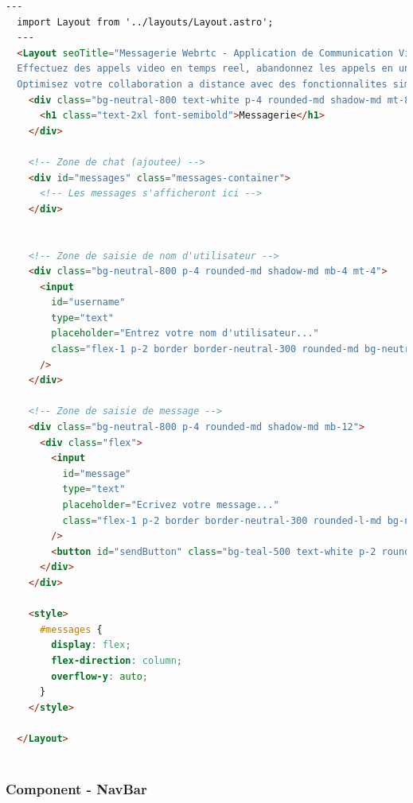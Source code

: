 \documentclass[12pt, a4paper, oneside]{article}
\begin{document}
\begin{lstlisting}[language=HTML, caption={Page - Messagerie}, label=Page - Messagerie]
  ---
  import Layout from '../layouts/Layout.astro';
  ---
  <Layout seoTitle="Messagerie Webrtc - Application de Communication Video en Temps Reel" seoDesc="Facilitez vos reunions professionnelles avec notre application de projet Webrtc. 
  Effectuez des appels video en temps reel, abandonnez les appels en un clic, et gerez facilement le son et la camera. 
  Optimisez votre collaboration a distance avec des fonctionnalites simples et efficaces.">
    <div class="bg-neutral-800 text-white p-4 rounded-md shadow-md mt-8">
      <h1 class="text-2xl font-semibold">Messagerie</h1>
    </div>
  
    <!-- Zone de chat (ajoutee) -->
    <div id="messages" class="messages-container">
      <!-- Les messages s'afficheront ici -->
    </div>
  
  
    <!-- Zone de saisie de nom d'utilisateur -->
    <div class="bg-neutral-800 p-4 rounded-md shadow-md mb-4 mt-4">
      <input
        id="username"
        type="text"
        placeholder="Entrez votre nom d'utilisateur..."
        class="flex-1 p-2 border border-neutral-300 rounded-md bg-neutral-800"
      />
    </div>
  
    <!-- Zone de saisie de message -->
    <div class="bg-neutral-800 p-4 rounded-md shadow-md mb-12">
      <div class="flex">
        <input
          id="message"
          type="text"
          placeholder="Ecrivez votre message..."
          class="flex-1 p-2 border border-neutral-300 rounded-l-md bg-neutral-800"
        />
        <button id="sendButton" class="bg-teal-500 text-white p-2 rounded-r-md">Envoyer</button>
      </div>
    </div>
  
    <style>
      #messages {
        display: flex;
        flex-direction: column;
        overflow-y: auto;
      }
    </style>

  </Layout>
  
\end{lstlisting}


\newpage
\subsubsection{Component - NavBar}
\end{document}
